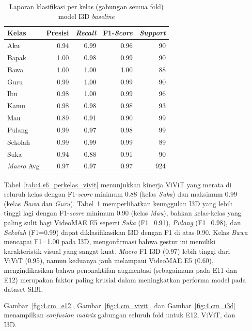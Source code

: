 \begin{table}[H]
\centering
\caption{Laporan klasifikasi per kelas (gabungan semua fold) model I3D \textit{baseline}}
\label{tab:4.s6_perkelas_i3d}
\footnotesize
\begin{tabular}{|l|r|r|r|r|}
\hline
Kelas & \multicolumn{1}{c|}{Presisi} & \multicolumn{1}{c|}{\textit{Recall}} & \multicolumn{1}{c|}{F1-\textit{Score}} & \multicolumn{1}{c|}{\textit{Support}} \\
\hline
Aku     & 0.94 & 0.99 & 0.96 & 90 \\
Bapak   & 1.00 & 0.98 & 0.99 & 90 \\
Bawa    & 1.00 & 1.00 & 1.00 & 88 \\
Guru    & 0.99 & 1.00 & 0.99 & 90 \\
Ibu     & 0.98 & 1.00 & 0.99 & 96 \\
Kamu    & 0.98 & 0.98 & 0.98 & 93 \\
Mau     & 0.89 & 0.91 & 0.90 & 99 \\
Pulang  & 0.99 & 0.97 & 0.98 & 99 \\
Sekolah & 0.99 & 0.99 & 0.99 & 89 \\
Suka    & 0.94 & 0.88 & 0.91 & 90 \\
\hline
\textit{Macro} Avg & 0.97 & 0.97 & 0.97 & 924 \\
\hline
\end{tabular}
\end{table}

Tabel~\ref{tab:4.s6_perkelas_vivit} menunjukkan kinerja ViViT yang merata di seluruh kelas dengan F1-\textit{score} minimum 0.88 (kelas \textit{Suka}) dan maksimum 0.99 (kelas \textit{Bawa} dan \textit{Guru}). Tabel~\ref{tab:4.s6_perkelas_i3d} memperlihatkan keunggulan I3D yang lebih tinggi lagi dengan F1-\textit{score} minimum 0.90 (kelas \textit{Mau}), bahkan kelas-kelas yang paling sulit bagi VideoMAE E5 seperti \textit{Suka} (F1=0.91), \textit{Pulang} (F1=0.98), dan \textit{Sekolah} (F1=0.99) dapat diklasifikasikan I3D dengan F1 di atas 0.90. Kelas \textit{Bawa} mencapai F1=1.00 pada I3D, mengonfirmasi bahwa gestur ini memiliki karakteristik visual yang sangat kuat. \textit{Macro} F1 I3D (0.97) lebih tinggi dari ViViT (0.95), namun keduanya jauh melampaui VideoMAE E5 (0.60), mengindikasikan bahwa penonaktifan augmentasi (sebagaimana pada E11 dan E12) merupakan faktor paling krusial dalam meningkatkan performa model pada dataset SIBI.\par

Gambar~\ref{fig:4.cm_e12}, Gambar~\ref{fig:4.cm_vivit}, dan Gambar~\ref{fig:4.cm_i3d} menampilkan \textit{confusion matrix} gabungan seluruh fold untuk E12, ViViT, dan I3D.\par

